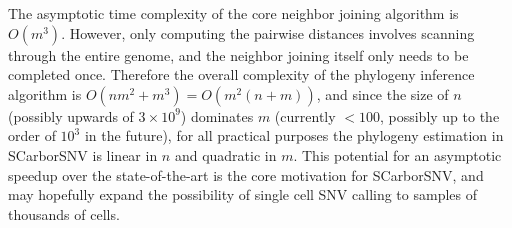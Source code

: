 \documentclass[../../main.tex]{subfiles}
\begin{document}
The asymptotic time complexity of the core neighbor joining algorithm is $O(m^3)$.
However, only computing the pairwise distances involves scanning through the entire genome, and the neighbor joining itself only needs to be completed once.
Therefore the overall complexity of the phylogeny inference algorithm is $O(nm^2 + m^3) = O(m^2(n+m))$, and since the size of $n$ (possibly upwards of $3\times10^9$) dominates $m$ (currently $<100$, possibly up to the order of $10^3$ in the future), for all practical purposes the phylogeny estimation in SCarborSNV is linear in $n$ and quadratic in $m$.
This potential for an asymptotic speedup over the state-of-the-art is the core motivation for SCarborSNV, and may hopefully expand the possibility of single cell SNV calling to samples of thousands of cells.
\end{document}
